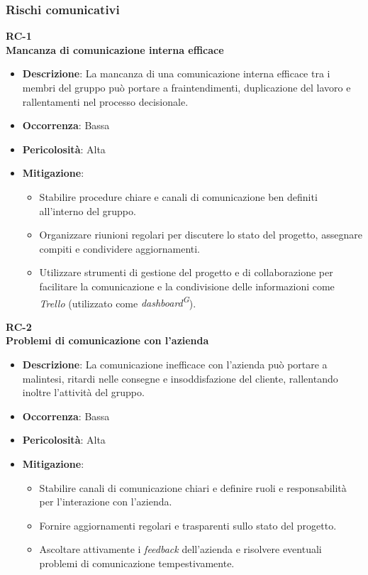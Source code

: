 \documentclass[5pt]{article}
\begin{document}
\subsubsection{Rischi comunicativi}
\textbf{RC-1}\\
\textbf{Mancanza di comunicazione interna efficace}
\begin{itemize}
  \item \textbf{Descrizione}: La mancanza di una comunicazione interna efficace tra i membri del gruppo può portare a fraintendimenti, duplicazione del lavoro e rallentamenti nel processo decisionale.
  \item \textbf{Occorrenza}: Bassa
  \item \textbf{Pericolosità}: Alta
  \item \textbf{Mitigazione}: 
    \begin{itemize}
      \item Stabilire procedure chiare e canali di comunicazione ben definiti all'interno del gruppo.
      \item Organizzare riunioni regolari per discutere lo stato del progetto, assegnare compiti e condividere aggiornamenti.
      \item Utilizzare strumenti di gestione del progetto e di collaborazione per facilitare la comunicazione e la condivisione delle informazioni come \textit{Trello} (utilizzato come \textit{dashboard\textsuperscript{G}}).
    \end{itemize}
\end{itemize}
\textbf{RC-2}\\
\textbf{Problemi di comunicazione con l'azienda}
\begin{itemize}
  \item \textbf{Descrizione}: La comunicazione inefficace con l'azienda può portare a malintesi, ritardi nelle consegne e insoddisfazione del cliente, rallentando inoltre l'attività del gruppo.
  \item \textbf{Occorrenza}: Bassa
  \item \textbf{Pericolosità}: Alta
  \item \textbf{Mitigazione}: 
    \begin{itemize}
      \item Stabilire canali di comunicazione chiari e definire ruoli e responsabilità per l'interazione con l'azienda.
      \item Fornire aggiornamenti regolari e trasparenti sullo stato del progetto.
      \item Ascoltare attivamente i \textit{feedback} dell'azienda e risolvere eventuali problemi di comunicazione tempestivamente.
    \end{itemize}
\end{itemize}
\end{document}
